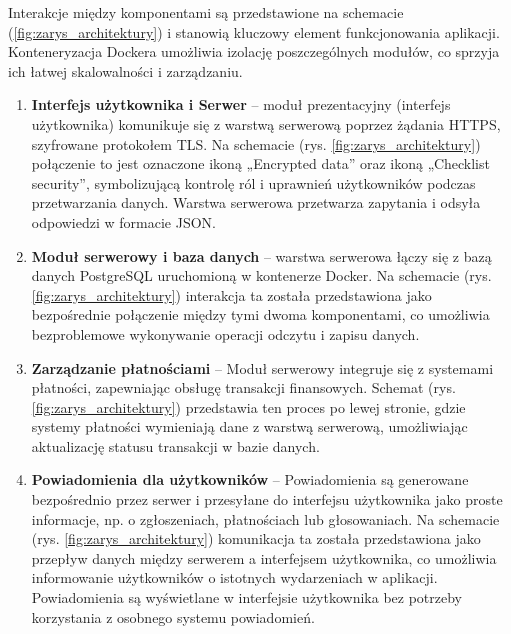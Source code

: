Interakcje między komponentami są przedstawione na schemacie (\ref{fig:zarys_architektury}) i stanowią kluczowy element funkcjonowania aplikacji. Konteneryzacja Dockera umożliwia izolację poszczególnych modułów, co sprzyja ich łatwej skalowalności i zarządzaniu.
\begin{enumerate}[label=\arabic*.]
	\item \textbf{Interfejs użytkownika i Serwer} – moduł prezentacyjny (interfejs użytkownika) komunikuje się z warstwą serwerową poprzez żądania HTTPS, szyfrowane protokołem TLS. Na schemacie (rys. \ref{fig:zarys_architektury}) połączenie to jest oznaczone ikoną „Encrypted data” oraz ikoną „Checklist security”, symbolizującą kontrolę ról i uprawnień użytkowników podczas przetwarzania danych. Warstwa serwerowa przetwarza zapytania i odsyła odpowiedzi w formacie JSON.

	\item \textbf{Moduł serwerowy i baza danych} – warstwa serwerowa łączy się z bazą danych PostgreSQL uruchomioną w kontenerze Docker. Na schemacie (rys. \ref{fig:zarys_architektury}) interakcja ta została przedstawiona jako bezpośrednie połączenie między tymi dwoma komponentami, co umożliwia bezproblemowe wykonywanie operacji odczytu i zapisu danych.

	\item \textbf{Zarządzanie płatnościami} – Moduł serwerowy integruje się z systemami płatności, zapewniając obsługę transakcji finansowych. Schemat (rys. \ref{fig:zarys_architektury}) przedstawia ten proces po lewej stronie, 
gdzie systemy płatności wymieniają dane z warstwą serwerową, umożliwiając aktualizację statusu transakcji w bazie danych.

	\item \textbf{Powiadomienia dla użytkowników} – Powiadomienia są generowane bezpośrednio przez serwer i przesyłane do interfejsu użytkownika jako proste informacje, np. o zgłoszeniach, płatnościach lub głosowaniach. Na schemacie (rys. \ref{fig:zarys_architektury}) komunikacja ta została przedstawiona jako przepływ danych między serwerem a interfejsem użytkownika, co umożliwia informowanie użytkowników o istotnych wydarzeniach w aplikacji. Powiadomienia są wyświetlane w interfejsie użytkownika bez potrzeby korzystania z osobnego systemu powiadomień.

	
\end{enumerate}


